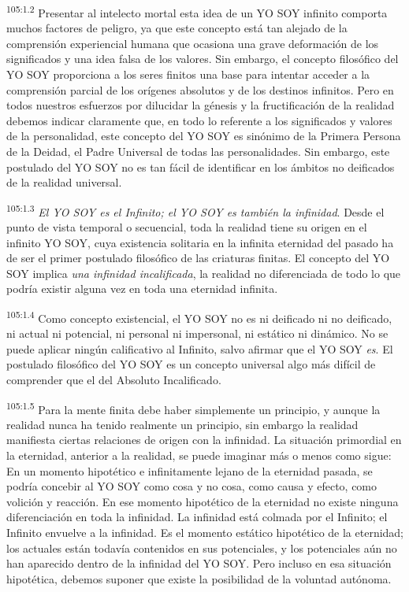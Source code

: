 \par
\textsuperscript{105:1.2} Presentar al intelecto mortal esta idea de un YO SOY infinito comporta muchos factores de peligro, ya que este concepto está tan alejado de la comprensión experiencial humana que ocasiona una grave deformación de los significados y una idea falsa de los valores. Sin embargo, el concepto filosófico del YO SOY proporciona a los seres finitos una base para intentar acceder a la comprensión parcial de los orígenes absolutos y de los destinos infinitos. Pero en todos nuestros esfuerzos por dilucidar la génesis y la fructificación de la realidad debemos indicar claramente que, en todo lo referente a los significados y valores de la personalidad, este concepto del YO SOY es sinónimo de la Primera Persona de la Deidad, el Padre Universal de todas las personalidades. Sin embargo, este postulado del YO SOY no es tan fácil de identificar en los ámbitos no deificados de la realidad universal.

\par
\textsuperscript{105:1.3} \textit{El YO SOY es el Infinito; el YO SOY es también la infinidad}. Desde el punto de vista temporal o secuencial, toda la realidad tiene su origen en el infinito YO SOY, cuya existencia solitaria en la infinita eternidad del pasado ha de ser el primer postulado filosófico de las criaturas finitas. El concepto del YO SOY implica \textit{una infinidad incalificada}, la realidad no diferenciada de todo lo que podría existir alguna vez en toda una eternidad infinita.

\par
\textsuperscript{105:1.4} Como concepto existencial, el YO SOY no es ni deificado ni no deificado, ni actual ni potencial, ni personal ni impersonal, ni estático ni dinámico. No se puede aplicar ningún calificativo al Infinito, salvo afirmar que el YO SOY \textit{es}. El postulado filosófico del YO SOY es un concepto universal algo más difícil de comprender que el del Absoluto Incalificado.

\par
\textsuperscript{105:1.5} Para la mente finita debe haber simplemente un principio, y aunque la realidad nunca ha tenido realmente un principio, sin embargo la realidad manifiesta ciertas relaciones de origen con la infinidad. La situación primordial en la eternidad, anterior a la realidad, se puede imaginar más o menos como sigue: En un momento hipotético e infinitamente lejano de la eternidad pasada, se podría concebir al YO SOY como cosa y no cosa, como causa y efecto, como volición y reacción. En ese momento hipotético de la eternidad no existe ninguna diferenciación en toda la infinidad. La infinidad está colmada por el Infinito; el Infinito envuelve a la infinidad. Es el momento estático hipotético de la eternidad; los actuales están todavía contenidos en sus potenciales, y los potenciales aún no han aparecido dentro de la infinidad del YO SOY. Pero incluso en esa situación hipotética, debemos suponer que existe la posibilidad de la voluntad autónoma.

